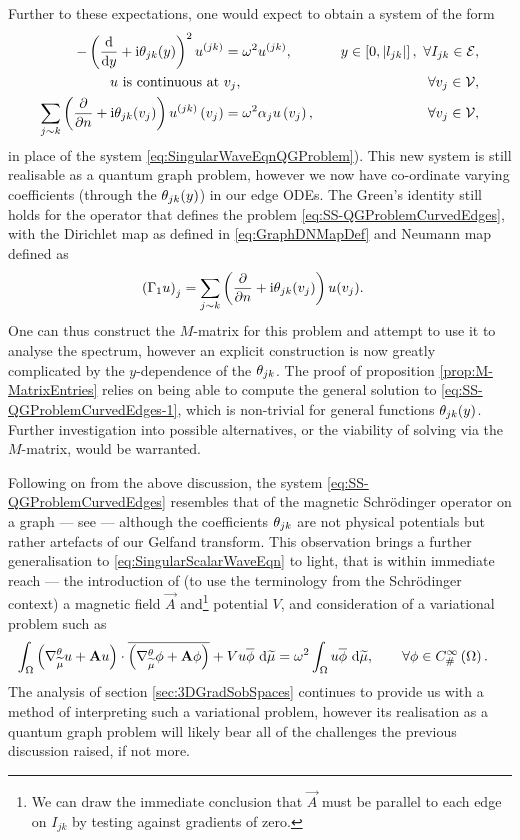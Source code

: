 Further to these expectations, one would expect to obtain a system of the form
\begin{subequations} \label{eq:SS-QGProblemCurvedEdges}
	\begin{align}
		-\left( \dfrac{\mathrm{d}}{\mathrm{d}y} + \mathrm{i}\theta_{jk}(y) \right)^2 u^{(jk)} &= \omega^2 u^{(jk)}, \quad &y\in\left[ 0,\left\lvert l_{jk} \right\rvert \right], \ \forall I_{jk}\in\mathcal{E}, \label{eq:SS-QGProblemCurvedEdges-1} \\
		u \text{ is continuous at } & v_j, \quad &\forall v_j\in\mathcal{V},  \\
		\sum_{j\sim k}\left( \dfrac{\partial }{\partial n} + \mathrm{i}\theta_{jk}(v_j) \right)u^{(jk)}\left( v_j \right) &= \omega^2\alpha_j u\left( v_j \right), \quad &\forall v_j\in\mathcal{V},
	\end{align}
\end{subequations}
in place of the system \eqref{eq:SingularWaveEqnQGProblem}).
This new system is still realisable as a quantum graph problem, however we now have co-ordinate varying coefficients (through the $\theta_{jk}(y)$) in our edge ODEs.
The Green's identity still holds for the operator that defines the problem \eqref{eq:SS-QGProblemCurvedEdges}, with the Dirichlet map as defined in \eqref{eq:GraphDNMapDef} and Neumann map defined as
\begin{align*}
	\left( \Gamma_1 u \right)_j &= \sum_{j\sim k} \left(  \dfrac{\partial }{\partial n} + \mathrm{i}\theta_{jk}(v_j)  \right)u(v_j) .
\end{align*}
One can thus construct the $M$-matrix for this problem and attempt to use it to analyse the spectrum, however an explicit construction is now greatly complicated by the $y$-dependence of the $\theta_{jk}$.
The proof of proposition \ref{prop:M-MatrixEntries} relies on being able to compute the general solution to \eqref{eq:SS-QGProblemCurvedEdges-1}, which is non-trivial for general functions $\theta_{jk}(y)$.
Further investigation into possible alternatives, or the viability of solving via the $M$-matrix, would be warranted.

Following on from the above discussion, the system \eqref{eq:SS-QGProblemCurvedEdges} resembles that of the magnetic Schr\"{o}dinger operator on a graph --- see \cite[section 7.5.1]{berkolaiko2013introduction} --- although the coefficients $\theta_{jk}$ are not physical potentials but rather artefacts of our Gelfand transform.
This observation brings a further generalisation to \eqref{eq:SingularScalarWaveEqn} to light, that is within immediate reach --- the introduction of (to use the terminology from the Schr\"{o}dinger context) a magnetic field $\vec{A}$ and\footnote{We can draw the immediate conclusion that $\vec{A}$ must be parallel to each edge on $I_{jk}$ by testing against gradients of zero.} potential $V$, and consideration of a variational problem such as
\begin{align*}
	\int_{\Omega} \left( \nabla^{\theta}_{\widetilde{\mu}}u + \mathbf{A}u \right)\cdot \overline{\left(  \nabla^{\theta}_{\widetilde{\mu}}\phi + \mathbf{A}\phi \right)} + Vu\overline{\phi}  \ \mathrm{d}\widetilde{\mu} 
	&= \omega^2\int_{\Omega}u\overline{\phi} \ \mathrm{d}\widetilde{\mu},
	\qquad \forall\phi\in C^{\infty}_{\#}\left( \Omega \right).
\end{align*}
The analysis of section \ref{sec:3DGradSobSpaces} continues to provide us with a method of interpreting such a variational problem, however its realisation as a quantum graph problem will likely bear all of the challenges the previous discussion raised, if not more.